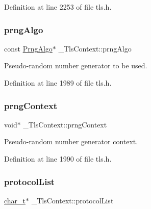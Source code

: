 Definition at line 2253 of file tls.\+h.

\mbox{\label{struct__TlsContext_ad127af70cd978e5b8e5fcda9873229e6}} 
\subsubsection{\texorpdfstring{prng\+Algo}{prngAlgo}}
{\footnotesize\ttfamily const \hyperlink{structPrngAlgo}{Prng\+Algo}$\ast$ \+\_\+\+Tls\+Context\+::prng\+Algo}



Pseudo-\/random number generator to be used. 



Definition at line 1989 of file tls.\+h.

\mbox{\label{struct__TlsContext_a32fba3ca095b163a1a0c29b9866cbba8}} 
\subsubsection{\texorpdfstring{prng\+Context}{prngContext}}
{\footnotesize\ttfamily void$\ast$ \+\_\+\+Tls\+Context\+::prng\+Context}



Pseudo-\/random number generator context. 



Definition at line 1990 of file tls.\+h.

\mbox{\label{struct__TlsContext_a4162801ce1b87cec59a7130c195b734b}} 
\subsubsection{\texorpdfstring{protocol\+List}{protocolList}}
{\footnotesize\ttfamily \hyperlink{compiler__port_8h_a40bb5262bf908c328fbcfbe5d29d0201}{char\+\_\+t}$\ast$ \+\_\+\+Tls\+Context\+::protocol\+List}



